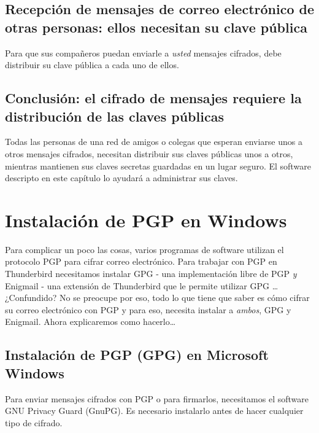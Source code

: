 \documentclass[10pt,a5paper,twoside,,]{book}
\begin{document}
\section{Recepción de mensajes de correo electrónico de otras personas:
ellos necesitan su clave
pública}\label{recepciuxf3n-de-mensajes-de-correo-electruxf3nico-de-otras-personas-ellos-necesitan-su-clave-puxfablica}

Para que sus compañeros puedan enviarle a \emph{usted} mensajes
cifrados, debe distribuir su clave pública a cada uno de ellos.

\section{Conclusión: el cifrado de mensajes requiere la distribución de
las claves
públicas}\label{conclusiuxf3n-el-cifrado-de-mensajes-requiere-la-distribuciuxf3n-de-las-claves-puxfablicas}

Todas las personas de una red de amigos o colegas que esperan enviarse
unos a otros mensajes cifrados, necesitan distribuir sus claves públicas
unos a otros, mientras mantienen sus claves secretas guardadas en un
lugar seguro. El software descripto en este capítulo lo ayudará a
administrar sus claves.

\chapter{Instalación de PGP en
Windows}\label{instalaciuxf3n-de-pgp-en-windows}

Para complicar un poco las cosas, varios programas de software utilizan
el protocolo PGP para cifrar correo electrónico. Para trabajar con PGP
en Thunderbird necesitamos instalar GPG - una implementación libre de
PGP \emph{y} Enigmail - una extensión de Thunderbird que le permite
utilizar GPG \ldots{} ¿Confundido? No se preocupe por eso, todo lo que
tiene que saber es cómo cifrar su correo electrónico con PGP y para eso,
necesita instalar a \emph{ambos}, GPG y Enigmail. Ahora explicaremos
como hacerlo\ldots{}

\section{Instalación de PGP (GPG) en Microsoft
Windows}\label{instalaciuxf3n-de-pgp-gpg-en-microsoft-windows}

Para enviar mensajes cifrados con PGP o para firmarlos, necesitamos el
software GNU Privacy Guard (GnuPG). Es necesario instalarlo antes de
hacer cualquier tipo de cifrado.
\end{document}
